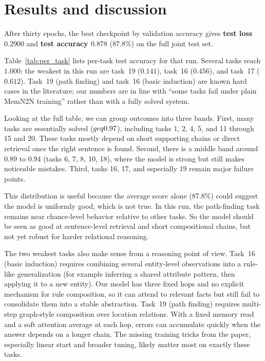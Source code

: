 \documentclass{article}
\begin{document}
\section{Results and discussion}

After thirty epochs, the best checkpoint by validation accuracy gives \textbf{test loss $0.2900$} and \textbf{test accuracy $0.878$} ($87.8\%$) on the full joint test set.

Table~\ref{tab:per_task} lists per-task test accuracy for that run. Several tasks reach $1.000$; the weakest in this run are task~19 ($0.141$), task~16 ($0.456$), and task~17 ($0.612$). Task~19 (path finding) and task~16 (basic induction) are known hard cases in the literature; our numbers are in line with ``some tasks fail under plain MemN2N training'' rather than with a fully solved system.

Looking at the full table, we can group outcomes into three bands. First, many tasks are essentially solved ($\\geq 0.97$), including tasks 1, 2, 4, 5, and 11 through 15 and 20. These tasks mostly depend on short supporting chains or direct retrieval once the right sentence is found. Second, there is a middle band around $0.89$ to $0.94$ (tasks 6, 7, 8, 10, 18), where the model is strong but still makes noticeable mistakes. Third, tasks 16, 17, and especially 19 remain major failure points.

This distribution is useful because the average score alone (87.8\%) could suggest the model is uniformly good, which is not true. In this run, the path-finding task remains near chance-level behavior relative to other tasks. So the model should be seen as good at sentence-level retrieval and short compositional chains, but not yet robust for harder relational reasoning.

The two weakest tasks also make sense from a reasoning point of view. Task~16 (basic induction) requires combining several entity-level observations into a rule-like generalization (for example inferring a shared attribute pattern, then applying it to a new entity). Our model has three fixed hops and no explicit mechanism for rule composition, so it can attend to relevant facts but still fail to consolidate them into a stable abstraction. Task~19 (path finding) requires multi-step graph-style composition over location relations. With a fixed memory read and a soft attention average at each hop, errors can accumulate quickly when the answer depends on a longer chain. The missing training tricks from the paper, especially linear start and broader tuning, likely matter most on exactly these tasks.
\end{document}
